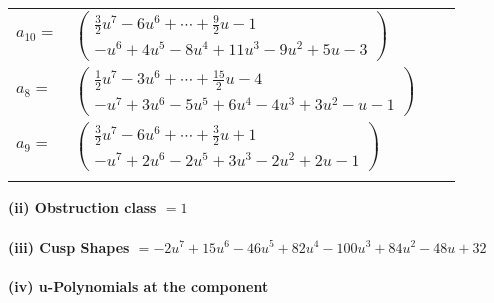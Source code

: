 \documentclass[1p]{elsarticle_modified}
\theoremstyle{definition}
\begin{document}
\begin{tabular}{m{7pt} m{180pt} m{7pt} m{180pt} }
\flushright $a_{10}=$&$\begin{pmatrix}\frac{3}{2} u^7-6 u^6+\cdots+\frac{9}{2} u-1\\- u^6+4 u^5-8 u^4+11 u^3-9 u^2+5 u-3\end{pmatrix}$ \\
\flushright $a_{8}=$&$\begin{pmatrix}\frac{1}{2} u^7-3 u^6+\cdots+\frac{15}{2} u-4\\- u^7+3 u^6-5 u^5+6 u^4-4 u^3+3 u^2- u-1\end{pmatrix}$ \\
\flushright $a_{9}=$&$\begin{pmatrix}\frac{3}{2} u^7-6 u^6+\cdots+\frac{3}{2} u+1\\- u^7+2 u^6-2 u^5+3 u^3-2 u^2+2 u-1\end{pmatrix}$\\&\end{tabular}
\flushleft \textbf{(ii) Obstruction class $= 1$}\\~\\
\flushleft \textbf{(iii) Cusp Shapes $= -2 u^7+15 u^6-46 u^5+82 u^4-100 u^3+84 u^2-48 u+32$}\\~\\
\newpage\renewcommand{\arraystretch}{1}
\flushleft \textbf{(iv) u-Polynomials at the component}\newline \\
\end{document}
